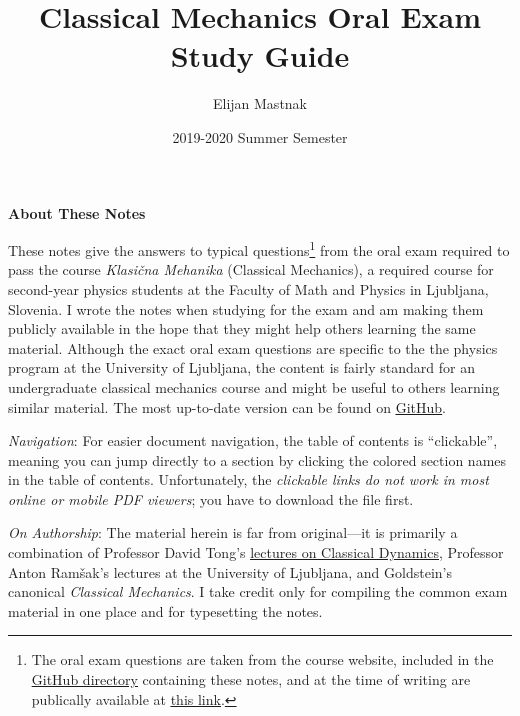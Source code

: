 \documentclass[11pt, a4paper]{article}
\begin{document}
\title{Classical Mechanics Oral Exam Study Guide}
\author{Elijan Mastnak}
\date{2019-2020 Summer Semester}
\maketitle

\begin{center}
\textbf{About These Notes}
\end{center}
These notes give the answers to typical questions\footnote{The oral exam questions are taken from the course website, included in the \href{https://github.com/ejmastnak/fmf/tree/main/classical-mechanics/classical-mechanics-oral-study-guide}{\underline{GitHub directory}} containing these notes, and at the time of writing are publically available at \href{http://www-f1.ijs.si/~ramsak/KlasMeh/Izpitna.pdf}{\underline{this link}}.} from the oral exam required to pass the course \textit{Klasi\v{c}na Mehanika} (Classical Mechanics), a required course for second-year physics students at the Faculty of Math and Physics in Ljubljana, Slovenia. I wrote the notes when studying for the exam and am making them publicly available in the hope that they might help others learning the same material. Although the exact oral exam questions are specific to the the physics program at the University of Ljubljana, the content is fairly standard for an undergraduate classical mechanics course and might be useful to others learning similar material. The most up-to-date version can be found on \href{https://github.com/ejmastnak/fmf/tree/main/classical-mechanics}{\underline{GitHub}}.

\vspace{2mm}
\textit{Navigation}: For easier document navigation, the table of contents is ``clickable'', meaning you can jump directly to a section by clicking the colored section names in the table of contents. Unfortunately, the \textit{clickable links do not work in most online or mobile PDF viewers}; you have to download the file first.

\vspace{2mm}
\textit{On Authorship}: The material herein is far from original---it is primarily a combination of Professor David Tong's \href{http://www.damtp.cam.ac.uk/user/tong/dynamics.html}{\underline{lectures on Classical Dynamics}}, Professor Anton Ram\v{s}ak's lectures at the University of Ljubljana, and Goldstein's canonical \textit{Classical Mechanics}. I take credit only for compiling the common exam material in one place and for typesetting the notes.
\end{document}
